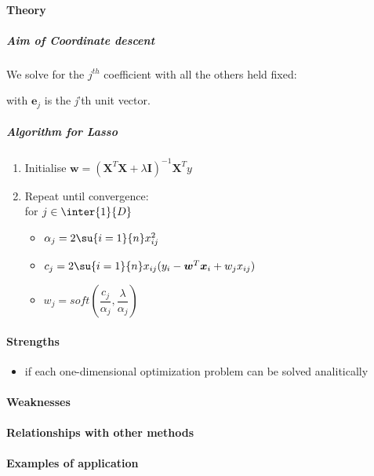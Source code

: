 \paragraph{Theory}
\subparagraph{Aim of Coordinate descent}
We solve for the $j^{th}$ coefficient with all the others held fixed: 
\begin{center}
     with $\bm{e}_{j}$
    is the \emph{j}'th unit vector. 
\end{center}


\subparagraph{Algorithm for Lasso}
\begin{enumerate}
    \item Initialise $\bm{w} = \left(\bm{X}^{T}\bm{X} + \lambda\bm{I}\right)^{-1}\bm{X}^{T}y$
    \item Repeat until convergence:\\for $j\in\inter{1}{D}$
        \begin{itemize}
            \item $\alpha_{j} = 2\su{i=1}{n}x_{ij}^{2}$
            \item $c_{j} = 2\su{i=1}{n}x_{ij}(y_{i} - \bm{w}^{T}\bm{x}_{i} + w_{j}x_{ij})$
            \item $w_{j} = soft\left(\dfrac{c_{j}}{\alpha_{j}}, \dfrac{\lambda}{\alpha_{j}}\right)$
        \end{itemize}
\end{enumerate}


\paragraph{Strengths}
\begin{itemize}
    \item if each one-dimensional optimization problem can be solved analitically
\end{itemize}

\paragraph{Weaknesses}
\paragraph{Relationships with other methods}
\paragraph{Examples of application}

